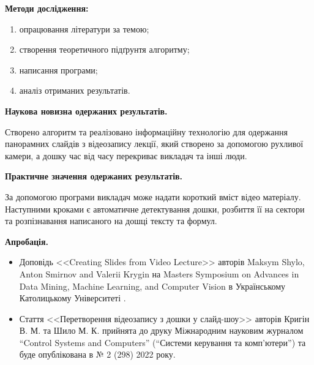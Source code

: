\textbf{Методи дослідження:}
\begin{enumerate}
      \item опрацювання літератури за темою;
      \item створення теоретичного підґрунтя алгоритму;
      \item написання програми;
      \item аналіз отриманих результатів.
\end{enumerate}

\textbf{Наукова новизна одержаних результатів.}

Створено алгоритм та реалізовано інформаційну технологію
для одержання панорамних слайдів з відеозапису лекції,
який створено за допомогою рухливої камери,
а дошку час від часу перекриває викладач та інші люди.

\textbf{Практичне значення одержаних результатів.}

За допомогою програми викладач може надати короткий вміст
відео матеріалу. Наступними кроками є автоматичне детектування
дошки, розбиття її на сектори та розпізнавання написаного на
дошці тексту та формул.

\textbf{Апробація.}
\begin{itemize}
      \item Доповідь <<Creating Slides from Video Lecture>> авторів Maksym Shylo, 
            Anton Smirnov and Valerii Krygin на Masters Symposium on Advances in Data Mining,
            Machine Learning, and Computer Vision в Українському Католицькому Університеті \cite{bib:masters_symposium}.
      \item Стаття <<Перетворення відеозапису з дошки у слайд-шоу>> авторів
            Кригін В. М. та Шило М. К. прийнята до друку
            Міжнародним науковим журналом “Control Systems and Computers”
            (“Системи керування та комп'ютери”) та буде опублікована в № 2 (298) 2022 року.
\end{itemize}